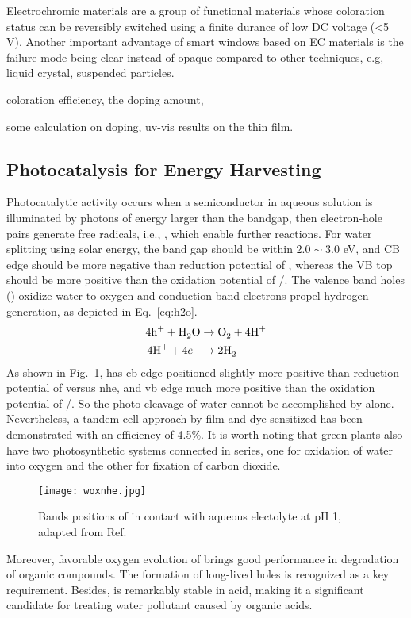 Electrochromic materials are a group of functional materials whose coloration status can be reversibly switched using a finite durance of low DC voltage (\textless 5 V). Another important advantage of smart windows based on EC materials is the failure mode being clear instead of opaque compared to other techniques, e.g, liquid crystal, suspended particles. 

coloration efficiency, the doping amount, 

some calculation on doping, uv-vis results on the thin film. 
 

\subsection{Photocatalysis for Energy Harvesting}

Photocatalytic activity occurs when a semiconductor in aqueous solution is illuminated by photons of energy larger than the bandgap, then electron-hole pairs generate free radicals, i.e., , which enable further reactions. For water splitting using solar energy, the band gap should be within $2.0 \sim 3.0 $ eV, and CB edge should be more negative than reduction potential of , whereas the VB top should be more positive than the oxidation potential of /.\cite{Osterloh2008,Wang2012} The valence band holes () oxidize water to oxygen and conduction band electrons propel hydrogen generation, as depicted in Eq.~\ref{eq:h2o}.
\begin{subequations}\label{eq:h2o}
\begin{align}
4\ce{h^+} +  \ce{H2O} &\rightarrow \ce{O2} + 4\ce{H^+} \label{eq:hervb}\\
4\ce{H^+} +  4e^- &\rightarrow 2\ce{H2} \label{eq:hercb}
\end{align}
\end{subequations}
As shown in Fig.~\ref{fig:woxnhe},  has \gls{cb} edge positioned slightly more positive than reduction potential of  versus \gls{nhe}, and \gls{vb} edge much more positive than the oxidation potential of /. So the photo-cleavage of water cannot be accomplished by  alone. Nevertheless, a tandem cell approach by  film and dye-sensitized  has been demonstrated with an efficiency of 4.5\%.\cite{Michael1999} It is worth noting that green plants also have two photosynthetic systems connected in series, one for oxidation of water into oxygen and the other for fixation of carbon dioxide.
\begin{figure}[htb]
\centering
\texttt{[image: woxnhe.jpg]}
\caption[Bands positions of  versus NHE]{Bands positions of  in contact with aqueous electolyte at pH 1, adapted from Ref.\cite{Gratzel2001}}
\label{fig:woxnhe}
\end{figure}
Moreover, favorable oxygen evolution of  brings good performance in degradation of organic compounds\cite{Hepel2001,Luo2001,Watcharenwong2008}. The formation of long-lived holes is recognized as a key requirement.\cite{Pesci2011} Besides,  is remarkably stable in acid, making it a significant candidate for treating water pollutant caused by organic acids.\cite{Monllor-Satoca2006}

